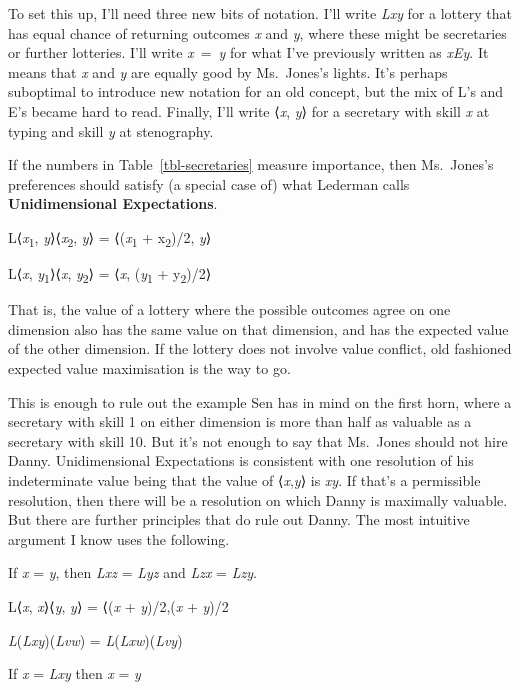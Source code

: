 \documentclass[
  11pt,
  letterpaper,
  DIV=11,
  numbers=noendperiod,
  twoside]{scrartcl}
\providecommand{\tightlist}{%
  \setlength{\itemsep}{0pt}\setlength{\parskip}{0pt}}
\begin{document}
To set this up, I'll need three new bits of notation. I'll write
\emph{Lxy} for a lottery that has equal chance of returning outcomes
\emph{x} and \emph{y}, where these might be secretaries or further
lotteries. I'll write \emph{x}~=~\emph{y} for what I've previously
written as \emph{xEy}. It means that \emph{x} and \emph{y} are equally
good by Ms.~Jones's lights. It's perhaps suboptimal to introduce new
notation for an old concept, but the mix of L's and E's became hard to
read. Finally, I'll write ⟨\emph{x}, \emph{y}⟩ for a secretary with
skill \emph{x} at typing and skill \emph{y} at stenography.

If the numbers in Table~\ref{tbl-secretaries} measure importance, then
Ms.~Jones's preferences should satisfy (a special case of) what Lederman
calls \textbf{Unidimensional Expectations}.

\begin{description}
\tightlist
\item[Unidimensional Expectations (UE)]
L⟨\emph{x}\textsubscript{1}, \emph{y}⟩⟨\emph{x}\textsubscript{2},
\emph{y}⟩ = ⟨(\emph{x}\textsubscript{1} + x\textsubscript{2})/2,
\emph{y}⟩

L⟨\emph{x}, \emph{y}\textsubscript{1}⟩⟨\emph{x},
\emph{y}\textsubscript{2}⟩ = ⟨\emph{x}, (\emph{y}\textsubscript{1} +
y\textsubscript{2})/2⟩
\end{description}

That is, the value of a lottery where the possible outcomes agree on one
dimension also has the same value on that dimension, and has the
expected value of the other dimension. If the lottery does not involve
value conflict, old fashioned expected value maximisation is the way to
go.

This is enough to rule out the example Sen has in mind on the first
horn, where a secretary with skill 1 on either dimension is more than
half as valuable as a secretary with skill 10. But it's not enough to
say that Ms.~Jones should not hire Danny. Unidimensional Expectations is
consistent with one resolution of his indeterminate value being that the
value of ⟨\emph{x},\emph{y}⟩ is \emph{xy}. If that's a permissible
resolution, then there will be a resolution on which Danny is maximally
valuable. But there are further principles that do rule out Danny. The
most intuitive argument I know uses the following.

\begin{description}
\tightlist
\item[Substitution of Identicals (SI)]
If \emph{x} = \emph{y}, then \emph{Lxz} = \emph{Lyz} and \emph{Lzx} =
\emph{Lzy}.
\item[No Trade-Off (NT)]
L⟨\emph{x}, \emph{x}⟩⟨\emph{y}, \emph{y}⟩ = ⟨(\emph{x} +
\emph{y})/2,(\emph{x} + \emph{y})/2
\item[Rearrangement of Outcomes (RO)]
\emph{L}(\emph{Lxy})(\emph{Lvw}) = \emph{L}(\emph{Lxw})(\emph{Lvy})
\item[Weak Independence (WI)]
If \emph{x} = \emph{Lxy} then \emph{x} = \emph{y}
\end{description}
\end{document}
